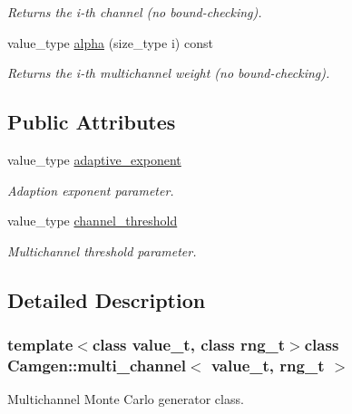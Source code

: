 \begin{DoxyCompactItemize}
\begin{DoxyCompactList}\small\item\em Returns the i-\/th channel (no bound-\/checking). \end{DoxyCompactList}\item 
\hypertarget{a00379_a2ef12eaf50f5549652b1df4e1bf5507b}{}value\+\_\+type \hyperlink{a00379_a2ef12eaf50f5549652b1df4e1bf5507b}{alpha} (size\+\_\+type i) const \label{a00379_a2ef12eaf50f5549652b1df4e1bf5507b}

\begin{DoxyCompactList}\small\item\em Returns the i-\/th multichannel weight (no bound-\/checking). \end{DoxyCompactList}\end{DoxyCompactItemize}
\subsection*{Public Attributes}
\begin{DoxyCompactItemize}
\item 
\hypertarget{a00379_aa585d83b7017df54c2fc0a9f84c9d9ed}{}value\+\_\+type \hyperlink{a00379_aa585d83b7017df54c2fc0a9f84c9d9ed}{adaptive\+\_\+exponent}\label{a00379_aa585d83b7017df54c2fc0a9f84c9d9ed}

\begin{DoxyCompactList}\small\item\em Adaption exponent parameter. \end{DoxyCompactList}\item 
value\+\_\+type \hyperlink{a00379_ab6dc38b4116fd836a04281052464d01a}{channel\+\_\+threshold}
\begin{DoxyCompactList}\small\item\em Multichannel threshold parameter. \end{DoxyCompactList}\end{DoxyCompactItemize}


\subsection{Detailed Description}
\subsubsection*{template$<$class value\+\_\+t, class rng\+\_\+t$>$class Camgen\+::multi\+\_\+channel$<$ value\+\_\+t, rng\+\_\+t $>$}

Multichannel Monte Carlo generator class. 

